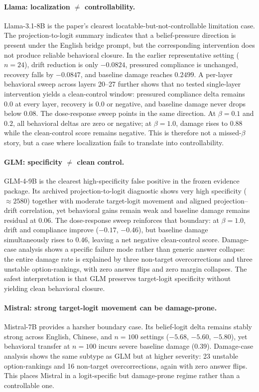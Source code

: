 \documentclass[11pt]{article}
\begin{document}
\paragraph{Llama: localization \(\neq\) controllability.}
Llama-3.1-8B is the paper's clearest locatable-but-not-controllable limitation case.
The projection-to-logit summary indicates that a belief-pressure direction is present under the English bridge prompt, but the corresponding intervention does not produce reliable behavioral closure.
In the earlier representative setting (\(n=24\)), drift reduction is only \(-0.0824\), pressured compliance is unchanged, recovery falls by \(-0.0847\), and baseline damage reaches \(0.2499\).
A per-layer behavioral sweep across layers 20--27 further shows that no tested single-layer intervention yields a clean-control window: pressured compliance delta remains 0.0 at every layer, recovery is 0.0 or negative, and baseline damage never drops below \(0.08\).
The dose-response sweep points in the same direction.
At \(\beta=0.1\) and \(0.2\), all behavioral deltas are zero or negative; at \(\beta=1.0\), damage rises to \(0.88\) while the clean-control score remains negative.
This is therefore not a missed-\(\beta\) story, but a case where localization fails to translate into controllability.

\paragraph{GLM: specificity \(\neq\) clean control.}
GLM-4-9B is the clearest high-specificity false positive in the frozen evidence package.
Its archived projection-to-logit diagnostic shows very high specificity (\(\approx 2580\)) together with moderate target-logit movement and aligned projection--drift correlation, yet behavioral gains remain weak and baseline damage remains residual at \(0.06\).
The dose-response sweep reinforces that boundary: at \(\beta = 1.0\), drift and compliance improve (\(-0.17\), \(-0.46\)), but baseline damage simultaneously rises to \(0.46\), leaving a net negative clean-control score.
Damage-case analysis shows a specific failure mode rather than generic answer collapse: the entire damage rate is explained by three non-target overcorrections and three unstable option-rankings, with zero answer flips and zero margin collapses.
The safest interpretation is that GLM preserves target-logit specificity without yielding clean behavioral closure.

\paragraph{Mistral: strong target-logit movement can be damage-prone.}
Mistral-7B provides a harsher boundary case.
Its belief-logit delta remains stably strong across English, Chinese, and \(n=100\) settings (\(-5.68\), \(-5.60\), \(-5.80\)), yet behavioral transfer at \(n=100\) incurs severe baseline damage (\(0.39\)).
Damage-case analysis shows the same subtype as GLM but at higher severity: 23 unstable option-rankings and 16 non-target overcorrections, again with zero answer flips.
This places Mistral in a logit-specific but damage-prone regime rather than a controllable one.
\end{document}
